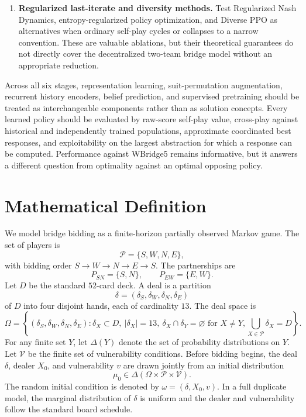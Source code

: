 \documentclass[11pt]{article}
\begin{document}
\begin{enumerate}
    \item \textbf{Regularized last-iterate and diversity methods.} Test Regularized Nash Dynamics, entropy-regularized policy optimization, and Diverse PPO as alternatives when ordinary self-play cycles or collapses to a narrow convention. These are valuable ablations, but their theoretical guarantees do not directly cover the decentralized two-team bridge model without an appropriate reduction.
\end{enumerate}

Across all six stages, representation learning, suit-permutation augmentation, recurrent history encoders, belief prediction, and supervised pretraining should be treated as interchangeable components rather than as solution concepts. Every learned policy should be evaluated by raw-score self-play value, cross-play against historical and independently trained populations, approximate coordinated best responses, and exploitability on the largest abstraction for which a response can be computed. Performance against WBridge5 remains informative, but it answers a different question from optimality against an optimal opposing policy.

\section{Mathematical Definition}

We model bridge bidding as a finite-horizon partially observed Markov game. The set of players is
\[
    \mathcal{P}=\{S,W,N,E\},
\]
with bidding order $S\to W\to N\to E\to S$. The partnerships are
\[
    P_{SN}=\{S,N\}, \qquad P_{EW}=\{E,W\}.
\]
Let $D$ be the standard $52$-card deck. A deal is a partition
\[
    \delta=(\delta_S,\delta_W,\delta_N,\delta_E)
\]
of $D$ into four disjoint hands, each of cardinality $13$. The deal space is
\[
    \Omega = \left\{(\delta_S,\delta_W,\delta_N,\delta_E): \delta_X \subset D,\ |\delta_X|=13,\ \delta_X\cap \delta_Y=\varnothing\text{ for }X\neq Y,
    \bigcup_{X\in\mathcal{P}}\delta_X=D\right\}.
\]
For any finite set $Y$, let $\Delta(Y)$ denote the set of probability distributions on $Y$. Let $\mathcal{V}$ be the finite set of vulnerability conditions. Before bidding begins, the deal $\delta$, dealer $X_0$, and vulnerability $v$ are drawn jointly from an initial distribution
\[
    \mu_0\in\Delta(\Omega\times\mathcal{P}\times\mathcal{V}).
\]
The random initial condition is denoted by $\omega=(\delta,X_0,v)$. In a full duplicate model, the marginal distribution of $\delta$ is uniform and the dealer and vulnerability follow the standard board schedule.
\end{document}
